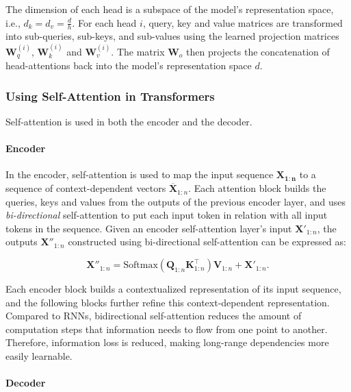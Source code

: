 The dimension of each head is a subspace of the model's representation space, i.e., $d_k = d_v = \frac{d}{h}$. For each head $i$, query, key and value matrices are transformed into sub-queries, sub-keys, and sub-values using the learned projection matrices $\bm{W}^{(i)}_q$, $\bm{W}^{(i)}_k$ and $\bm{W}^{(i)}_v$. The matrix $\bm{W}_o$ then projects the concatenation of head-attentions back into the model's representation space $d$.


\subsubsection{Using Self-Attention in Transformers}

Self-attention is used in both the encoder and the decoder.

\paragraph{Encoder} 
In the encoder, self-attention is used to map the input sequence $\bm{X_{1:n}}$ to a sequence of context-dependent vectors $\bm{\overline{X}}_{1:n}$. Each attention block builds the queries, keys and values from the outputs of the previous encoder layer, and uses \textit{bi-directional} self-attention to put each input token in relation with all input tokens in the sequence. Given an encoder self-attention layer's input $\bm{X'}_{1:n}$, the outputs $\bm{X''}_{1:n}$ constructed using bi-directional self-attention can be expressed as:

\begin{equation}
    \bm{X''}_{1:n} = \mathrm{Softmax}(\bm{Q}_{1:n}\bm{K}^{\top}_{1:n}) \bm{V}_{1:n} + \bm{X'}_{1:n}.
\end{equation}

Each encoder block builds a contextualized representation of its input sequence, and the following blocks further refine this context-dependent representation. Compared to \acp{RNN}, bidirectional self-attention reduces the amount of computation steps that information needs to flow from one point to another. Therefore, information loss is reduced, making long-range dependencies more easily learnable.

\paragraph{Decoder} 

